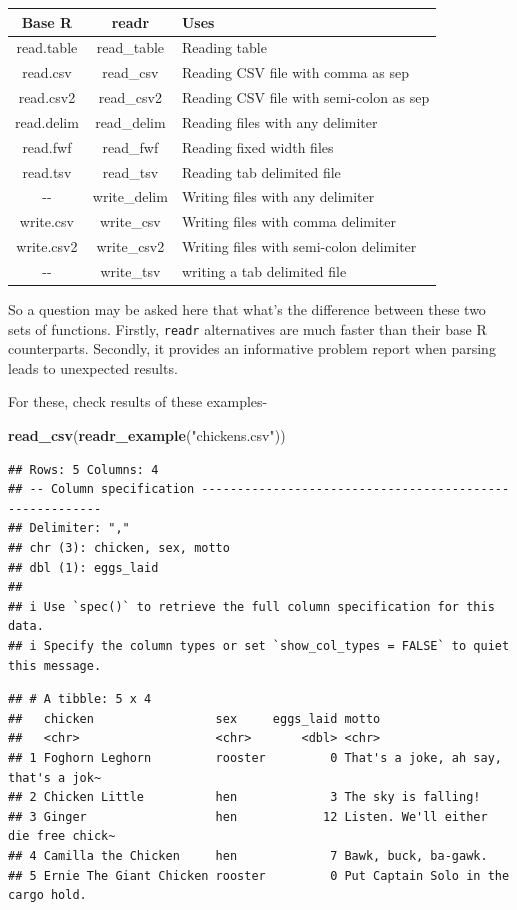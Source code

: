 \documentclass[
]{book}
\newenvironment{Shaded}{\begin{snugshade}}{\end{snugshade}}
\newcommand{\FunctionTok}[1]{\textcolor[rgb]{0.13,0.29,0.53}{\textbf{#1}}}
\newcommand{\NormalTok}[1]{#1}
\newcommand{\StringTok}[1]{\textcolor[rgb]{0.31,0.60,0.02}{#1}}
\begin{document}
\begin{longtable}[]{@{}ccl@{}}
\toprule\noalign{}
Base R & readr & Uses \\
\midrule\noalign{}
\endhead
\bottomrule\noalign{}
\endlastfoot
read.table & read\_table & Reading table \\
read.csv & read\_csv & Reading CSV file with comma as sep \\
read.csv2 & read\_csv2 & Reading CSV file with semi-colon as sep \\
read.delim & read\_delim & Reading files with any delimiter \\
read.fwf & read\_fwf & Reading fixed width files \\
read.tsv & read\_tsv & Reading tab delimited file \\
-\/- & write\_delim & Writing files with any delimiter \\
write.csv & write\_csv & Writing files with comma delimiter \\
write.csv2 & write\_csv2 & Writing files with semi-colon delimiter \\
-\/- & write\_tsv & writing a tab delimited file \\
\end{longtable}

So a question may be asked here that what's the difference between these two sets of functions. Firstly, \texttt{readr} alternatives are much faster than their base R counterparts. Secondly, it provides an informative problem report when parsing leads to unexpected results.

For these, check results of these examples-

\begin{Shaded}
\begin{Highlighting}[]
\FunctionTok{read\_csv}\NormalTok{(}\FunctionTok{readr\_example}\NormalTok{(}\StringTok{"chickens.csv"}\NormalTok{))}
\end{Highlighting}
\end{Shaded}

\begin{verbatim}
## Rows: 5 Columns: 4
## -- Column specification --------------------------------------------------------
## Delimiter: ","
## chr (3): chicken, sex, motto
## dbl (1): eggs_laid
## 
## i Use `spec()` to retrieve the full column specification for this data.
## i Specify the column types or set `show_col_types = FALSE` to quiet this message.
\end{verbatim}

\begin{verbatim}
## # A tibble: 5 x 4
##   chicken                 sex     eggs_laid motto                               
##   <chr>                   <chr>       <dbl> <chr>                               
## 1 Foghorn Leghorn         rooster         0 That's a joke, ah say, that's a jok~
## 2 Chicken Little          hen             3 The sky is falling!                 
## 3 Ginger                  hen            12 Listen. We'll either die free chick~
## 4 Camilla the Chicken     hen             7 Bawk, buck, ba-gawk.                
## 5 Ernie The Giant Chicken rooster         0 Put Captain Solo in the cargo hold.
\end{verbatim}
\end{document}

